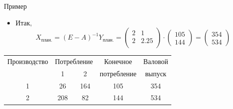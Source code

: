 \documentclass[unicode,11pt,notheorems,xcolor=table]{beamer}
\begin{document}
\begin{frame}[allowframebreaks]{Пример}{}
\begin{itemize}
\begin{multline*}
\begin{pmatrix}
			\mathcal{A}_{21} & \mathcal{A}_{22}\\ 
		\end{pmatrix}^T
		=\\
		= \frac{1}{0.4} 
		\begin{pmatrix}
			0.8 & 0.8\\ 
			0.4 & 0.9\\ 
		\end{pmatrix}^T
		= \frac{1}{0.4} 
		\begin{pmatrix}
			0.8 & 0.4\\ 
			0.8 & 0.9\\ 
		\end{pmatrix} 
		= 	
		\begin{pmatrix}
			2 & 1\\ 
			2 & 2.25\\ 
		\end{pmatrix} 
		\end{multline*}
	\item Итак, 
	$$
	X_\text{план.} = (E-A)^{-1} Y_\text{план.} = 
		\begin{pmatrix}
			2 & 1\\ 
			2 & 2.25\\ 
		\end{pmatrix} \cdot
		\begin{pmatrix}
			105\\ 144 
		\end{pmatrix}
		=
		\begin{pmatrix}
			354\\ 534 
		\end{pmatrix}
	$$
\end{itemize}
\framebreak
{}
{\centering
	\begin{tabular}{ccccc}
		\hline
		Производство & \multicolumn{2}{c}{Потребление}  &Конечное & Валовой\\
		  &  1 &   2 & потребление &выпуск\\
		\hline
		1 &  26& 164 &105& 354\\
		2 & 208&  82 &144& 534\\
		\hline
	\end{tabular}
	\par}
\end{frame}
\end{document}
